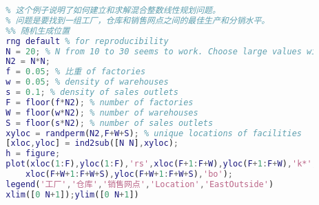         \begin{lstlisting}[language = Matlab]
        %% 工厂，仓库和销售网点
        % 这个例子说明了如何建立和求解混合整数线性规划问题。
        % 问题是要找到一组工厂，仓库和销售网点之间的最佳生产和分销水平。
        %% 随机生成位置
        rng default % for reproducibility
        N = 20; % N from 10 to 30 seems to work. Choose large values with caution.
        N2 = N*N;
        f = 0.05; % 比重 of factories
        w = 0.05; % density of warehouses
        s = 0.1; % density of sales outlets
        F = floor(f*N2); % number of factories
        W = floor(w*N2); % number of warehouses
        S = floor(s*N2); % number of sales outlets
        xyloc = randperm(N2,F+W+S); % unique locations of facilities
        [xloc,yloc] = ind2sub([N N],xyloc);
        h = figure;
        plot(xloc(1:F),yloc(1:F),'rs',xloc(F+1:F+W),yloc(F+1:F+W),'k*',...
            xloc(F+W+1:F+W+S),yloc(F+W+1:F+W+S),'bo');
        legend('工厂','仓库','销售网点','Location','EastOutside')
        xlim([0 N+1]);ylim([0 N+1])


\end{lstlisting}
